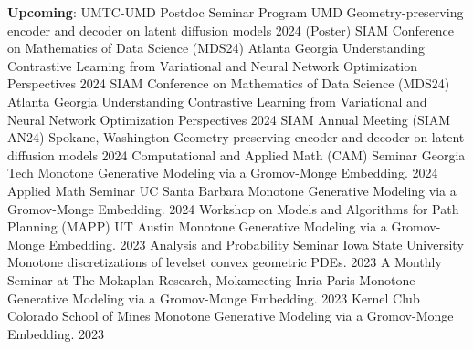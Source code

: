 

\begin{cvtalks}

\cvtalk
    {\textbf{Upcoming}: UMTC-UMD Postdoc Seminar Program} %
    {UMD}
    {Geometry-preserving encoder and decoder on latent diffusion models} %
    {2024} %
\cvtalk
    {(Poster) SIAM Conference on Mathematics of Data Science (MDS24)} %
    {Atlanta Georgia}
    {Understanding Contrastive Learning from Variational and Neural Network Optimization Perspectives} %
    {2024} %
\cvtalk
    {SIAM Conference on Mathematics of Data Science (MDS24)} %
    {Atlanta Georgia}
    { Understanding Contrastive Learning from Variational and Neural Network Optimization Perspectives} %
    {2024} %
\cvtalk
    {SIAM Annual Meeting (SIAM AN24)} %
    {Spokane, Washington}
    {Geometry-preserving encoder and decoder on latent diffusion models} %
    {2024} %
\cvtalk
    {Computational and Applied Math (CAM) Seminar} %
    {Georgia Tech}
    {Monotone Generative Modeling via a Gromov-Monge Embedding.} %
    {2024} %
\cvtalk
    {Applied Math Seminar} %
    {UC Santa Barbara}
    {Monotone Generative Modeling via a Gromov-Monge Embedding.} %
    {2024} %
\cvtalk
    {Workshop on Models and Algorithms for Path Planning (MAPP)} %
    {UT Austin}
    {Monotone Generative Modeling via a Gromov-Monge Embedding.} %
    {2023} %
\cvtalk
    {Analysis and Probability Seminar}
    {Iowa State University}
    {Monotone discretizations of levelset convex geometric PDEs.}
    {2023}
\cvtalk
    {A Monthly Seminar at The Mokaplan Research, Mokameeting} %
    {Inria Paris}
    {Monotone Generative Modeling via a Gromov-Monge Embedding.} %
    {2023} %
\cvtalk
    {Kernel Club} %
    {Colorado School of Mines}
    {Monotone Generative Modeling via a Gromov-Monge Embedding.} %
    {2023} %


\end{cvtalks}
